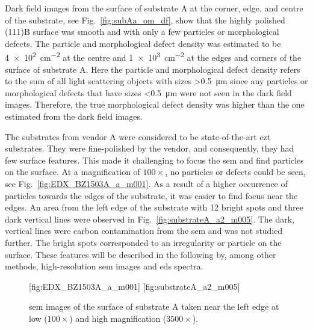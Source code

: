 Dark field images from the surface of substrate A at the corner, edge, and centre of the substrate, see Fig.~\ref{fig:subAa_om_df}, show that the highly polished (111)B surface was smooth and with only a few particles or morphological defects. The particle and morphological defect density was estimated to be \SI{4e2}{\centi\metre^{-2}} at the centre and \SI{1e3}{\centi\metre^{-2}} at the edges and corners of the surface of substrate A. Here the particle and morphological defect density refers to the sum of all light scattering objects with sizes \SI{>0.5}{\micro\metre} since any particles or morphological defects that have sizes \SI{<0.5}{\micro\metre} were not seen in the dark field images. Therefore, the true morphological defect density was higher than the one estimated from the dark field images.

The substrates from vendor A were considered to be state-of-the-art \ac{czt} substrates. They were fine-polished by the vendor, and consequently, they had few surface features. This made it challenging to focus the \ac{sem} and find particles on the surface. At a magnification of $100\times$, no particles or defects could be seen, see Fig.~\ref{fig:EDX_BZ1503A_a_m001}. As a result of a higher occurrence of particles towards the edges of the substrate, it was easier to find focus near the edges. An area from the left edge of the substrate with 12 bright spots and three dark vertical lines were observed in Fig.~\ref{fig:substrateA_a2_m005}. The dark, vertical lines were carbon contamination from the \ac{sem} and was not studied further. The bright spots corresponded to an irregularity or particle on the surface. These features will be described in the following by, among other methods, high-resolution \ac{sem} images and \ac{eds} spectra.

\begin{figure}[htbp]
    \centering
    [fig:EDX_BZ1503A_a_m001]
    \hfill
    [fig:substrateA_a2_m005]
    \caption[\Ac{sem} images of substrate A.]{\Ac{sem} images of the surface of substrate A taken near the left edge at  low ($100\times$) and  high magnification ($3500\times$).}
    \label{fig:subA_overview}
\end{figure}

